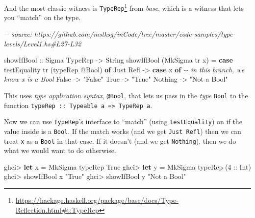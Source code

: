 \documentclass[]{article}
\newenvironment{Shaded}{}{}
\newcommand{\CommentTok}[1]{\textcolor[rgb]{0.38,0.63,0.69}{\textit{#1}}}
\newcommand{\DataTypeTok}[1]{\textcolor[rgb]{0.56,0.13,0.00}{#1}}
\newcommand{\DecValTok}[1]{\textcolor[rgb]{0.25,0.63,0.44}{#1}}
\newcommand{\KeywordTok}[1]{\textcolor[rgb]{0.00,0.44,0.13}{\textbf{#1}}}
\newcommand{\NormalTok}[1]{#1}
\newcommand{\OperatorTok}[1]{\textcolor[rgb]{0.40,0.40,0.40}{#1}}
\newcommand{\OtherTok}[1]{\textcolor[rgb]{0.00,0.44,0.13}{#1}}
\newcommand{\StringTok}[1]{\textcolor[rgb]{0.25,0.44,0.63}{#1}}
\renewcommand{\href}[2]{#2\footnote{\url{#1}}}
\begin{document}
And the most classic witness is
\href{https://hackage.haskell.org/package/base/docs/Type-Reflection.html\#t:TypeRep}{\texttt{TypeRep}}
from \emph{base}, which is a witness that lets you ``match'' on the type.

\begin{Shaded}
\begin{Highlighting}[]
\CommentTok{{-}{-} source: https://github.com/mstksg/inCode/tree/master/code{-}samples/type{-}levels/Level1.hs\#L27{-}L32}

\OtherTok{showIfBool ::} \DataTypeTok{Sigma} \DataTypeTok{TypeRep} \OtherTok{{-}\textgreater{}} \DataTypeTok{String}
\NormalTok{showIfBool (}\DataTypeTok{MkSigma}\NormalTok{ tr x) }\OtherTok{=} \KeywordTok{case}\NormalTok{ testEquality tr (typeRep }\OperatorTok{@}\DataTypeTok{Bool}\NormalTok{) }\KeywordTok{of}
  \DataTypeTok{Just} \DataTypeTok{Refl} \OtherTok{{-}\textgreater{}} \KeywordTok{case}\NormalTok{ x }\KeywordTok{of} \CommentTok{{-}{-} in this branch, we know x is a Bool}
    \DataTypeTok{False} \OtherTok{{-}\textgreater{}} \StringTok{"False"}
    \DataTypeTok{True} \OtherTok{{-}\textgreater{}} \StringTok{"True"}
  \DataTypeTok{Nothing} \OtherTok{{-}\textgreater{}} \StringTok{"Not a Bool"}
\end{Highlighting}
\end{Shaded}

This uses \emph{type application syntax}, \texttt{@Bool}, that lets us pass in
the \emph{type} \texttt{Bool} to the function
\texttt{typeRep\ ::\ Typeable\ a\ =\textgreater{}\ TypeRep\ a}.

Now we can use \texttt{TypeRep}'s interface to ``match'' (using
\texttt{testEquality}) on if the value inside is a \texttt{Bool}. If the match
works (and we get \texttt{Just\ Refl}) then we can treat \texttt{x} as a
\texttt{Bool} in that case. If it doesn't (and we get \texttt{Nothing}), then we
do what we would want to do otherwise.

\begin{Shaded}
\begin{Highlighting}[]
\NormalTok{ghci}\OperatorTok{\textgreater{}} \KeywordTok{let}\NormalTok{ x }\OtherTok{=} \DataTypeTok{MkSigma}\NormalTok{ typeRep }\DataTypeTok{True}
\NormalTok{ghci}\OperatorTok{\textgreater{}} \KeywordTok{let}\NormalTok{ y }\OtherTok{=} \DataTypeTok{MkSigma}\NormalTok{ typeRep (}\DecValTok{4}\OtherTok{ ::} \DataTypeTok{Int}\NormalTok{)}
\NormalTok{ghci}\OperatorTok{\textgreater{}}\NormalTok{ showIfBool x}
\StringTok{"True"}
\NormalTok{ghci}\OperatorTok{\textgreater{}}\NormalTok{ showIfBool y}
\StringTok{"Not a Bool"}
\end{Highlighting}
\end{Shaded}
\end{document}
